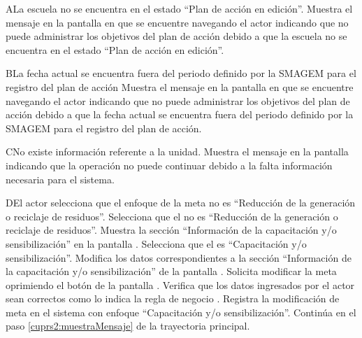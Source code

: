 \begin{UCtrayectoriaA}{A}{La escuela no se encuentra en el estado ``Plan de acción en edición''.}
    \UCpaso[\UCsist] Muestra el mensaje  en la pantalla en que se encuentre navegando el actor indicando que no puede administrar los objetivos del plan de acción debido a que la escuela no se encuentra en el estado ``Plan de acción en edición''. 
 \end{UCtrayectoriaA}
 
   \begin{UCtrayectoriaA}{B}{La fecha actual se encuentra fuera del periodo definido por la SMAGEM para el registro del plan de acción}
    \UCpaso[\UCsist] Muestra el mensaje  en la pantalla en que se encuentre navegando el actor indicando que no puede administrar los objetivos del plan de acción debido a que la fecha actual se encuentra fuera del periodo definido por la SMAGEM para el registro del plan de acción.
 \end{UCtrayectoriaA}

 
\begin{UCtrayectoriaA}{C}{No existe información referente a la unidad.}
	\UCpaso[\UCsist] Muestra el mensaje  en la pantalla  indicando que la operación no puede continuar debido a la falta información necesaria para el sistema.
\end{UCtrayectoriaA}

\begin{UCtrayectoriaA}{D}{El actor selecciona que el enfoque de la meta no es ``Reducción de la generación o reciclaje de residuos''.}
	\UCpaso[\UCactor] Selecciona que el  no es ``Reducción de la generación o reciclaje de residuos''. 
	\UCpaso[\UCsist] Muestra la sección ``Información de la capacitación y/o sensibilización'' en la pantalla .
	\UCpaso[\UCactor] Selecciona que el  es ``Capacitación y/o sensibilización''. 
	\UCpaso[\UCactor] Modifica los datos correspondientes a la sección ``Información de la capacitación y/o sensibilización'' de la pantalla .
	\UCpaso[\UCactor] Solicita modificar la meta oprimiendo el botón  de la pantalla .  
	\UCpaso[\UCsist] Verifica que los datos ingresados por el actor sean correctos como lo indica la regla de negocio .   
	\UCpaso[\UCsist] Registra la modificación de meta en el sistema con enfoque ``Capacitación y/o sensibilización''.
	\UCpaso[] Continúa en el paso \ref{cuprs2:muestraMensaje} de la trayectoria principal.
\end{UCtrayectoriaA}

